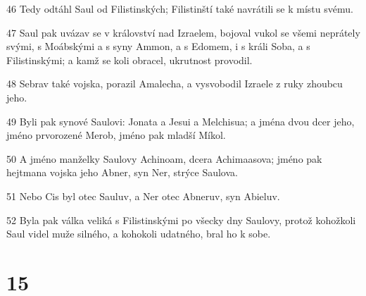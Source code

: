 \par 46 Tedy odtáhl Saul od Filistinských; Filistinští také navrátili se k místu svému.
\par 47 Saul pak uvázav se v království nad Izraelem, bojoval vukol se všemi neprátely svými, s Moábskými a s syny Ammon, a s Edomem, i s králi Soba, a s Filistinskými; a kamž se koli obracel, ukrutnost provodil.
\par 48 Sebrav také vojska, porazil Amalecha, a vysvobodil Izraele z ruky zhoubcu jeho.
\par 49 Byli pak synové Saulovi: Jonata a Jesui a Melchisua; a jména dvou dcer jeho, jméno prvorozené Merob, jméno pak mladší Míkol.
\par 50 A jméno manželky Saulovy Achinoam, dcera Achimaasova; jméno pak hejtmana vojska jeho Abner, syn Ner, strýce Saulova.
\par 51 Nebo Cis byl otec Sauluv, a Ner otec Abneruv, syn Abieluv.
\par 52 Byla pak válka veliká s Filistinskými po všecky dny Saulovy, protož kohožkoli Saul videl muže silného, a kohokoli udatného, bral ho k sobe.

\chapter{15}


